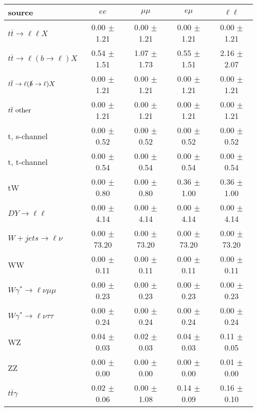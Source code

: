 \begin{tabular}{l|cccc} \hline\hline
source & $ee$ & $\mu\mu$ & $e\mu$ & $\ell\ell $ \\
\hline
$t\overline{t} \rightarrow \ell \ell X$ &  0.00 $\pm$  1.21 &  0.00 $\pm$  1.21 &  0.00 $\pm$  1.21 &  0.00 $\pm$  1.21 \\
$t\overline{t} \rightarrow \ell (b \rightarrow \ell) X$ &  0.54 $\pm$  1.51 &  1.07 $\pm$  1.73 &  0.55 $\pm$  1.51 &  2.16 $\pm$  2.07 \\
$t\overline{t} \rightarrow \ell (\slashed b \rightarrow \ell) X$ &  0.00 $\pm$  1.21 &  0.00 $\pm$  1.21 &  0.00 $\pm$  1.21 &  0.00 $\pm$  1.21 \\
        $t\overline{t}\ \rm{other}$ &  0.00 $\pm$  1.21 &  0.00 $\pm$  1.21 &  0.00 $\pm$  1.21 &  0.00 $\pm$  1.21 \\
\hline
                       t, s-channel &  0.00 $\pm$  0.52 &  0.00 $\pm$  0.52 &  0.00 $\pm$  0.52 &  0.00 $\pm$  0.52 \\
                       t, t-channel &  0.00 $\pm$  0.54 &  0.00 $\pm$  0.54 &  0.00 $\pm$  0.54 &  0.00 $\pm$  0.54 \\
                                 tW &  0.00 $\pm$  0.80 &  0.00 $\pm$  0.80 &  0.36 $\pm$  1.00 &  0.36 $\pm$  1.00 \\
\hline
         $DY \rightarrow \ell \ell$ &  0.00 $\pm$  4.14 &  0.00 $\pm$  4.14 &  0.00 $\pm$  4.14 &  0.00 $\pm$  4.14 \\
      $W+jets \rightarrow \ell \nu$ &  0.00 $\pm$ 73.20 &  0.00 $\pm$ 73.20 &  0.00 $\pm$ 73.20 &  0.00 $\pm$ 73.20 \\
                                 WW &  0.00 $\pm$  0.11 &  0.00 $\pm$  0.11 &  0.00 $\pm$  0.11 &  0.00 $\pm$  0.11 \\
\hline
$W\gamma^{*} \rightarrow \ell \nu \mu\mu$ &  0.00 $\pm$  0.23 &  0.00 $\pm$  0.23 &  0.00 $\pm$  0.23 &  0.00 $\pm$  0.23 \\
$W\gamma^{*} \rightarrow \ell \nu \tau\tau$ &  0.00 $\pm$  0.24 &  0.00 $\pm$  0.24 &  0.00 $\pm$  0.24 &  0.00 $\pm$  0.24 \\
                                 WZ &  0.04 $\pm$  0.03 &  0.02 $\pm$  0.03 &  0.04 $\pm$  0.03 &  0.11 $\pm$  0.05 \\
                                 ZZ &  0.00 $\pm$  0.00 &  0.00 $\pm$  0.00 &  0.00 $\pm$  0.00 &  0.01 $\pm$  0.00 \\
\hline
              $t\overline{t}\gamma$ &  0.02 $\pm$  0.06 &  0.00 $\pm$  1.08 &  0.14 $\pm$  0.09 &  0.16 $\pm$  0.10 \\

\end{tabular}
